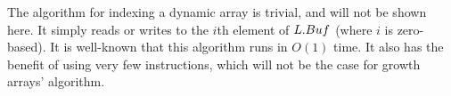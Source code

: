 \HdrDynArrayImpl

The algorithm for indexing a dynamic array is trivial, and will not be shown here. It simply reads or writes to the $i$th element of $L.Buf$ (where $i$ is zero-based). It is well-known that this algorithm runs in $O(1)$ time. It also has the benefit of using very few instructions, which will not be the case for growth arrays' algorithm.